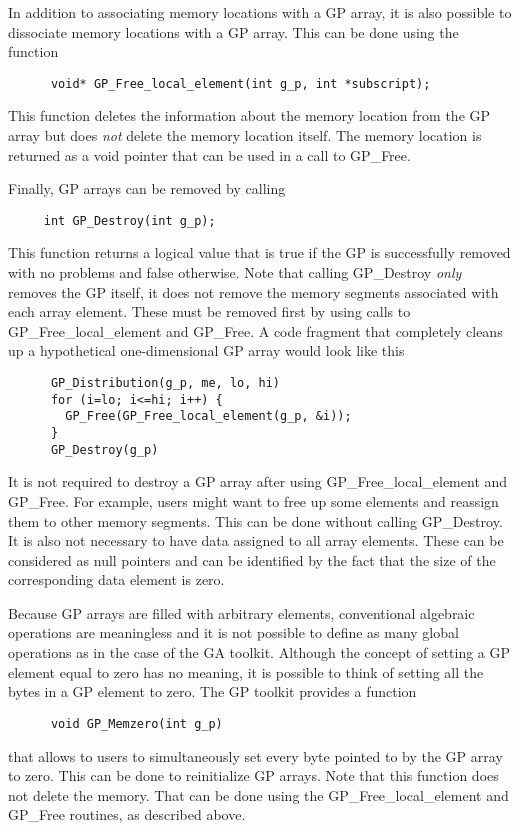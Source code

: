 In addition to associating memory locations with a GP array, it is also possible
to dissociate memory locations with a GP array. This can be done using the
function

\begin{verbatim}
      void* GP_Free_local_element(int g_p, int *subscript);
\end{verbatim}

\noindent
This function deletes the information about the memory location from the GP
array but does \emph{not} delete the memory location itself. The memory location
is returned as a void pointer that can be used in a call to GP\_Free.

Finally, GP arrays can be removed by calling

\begin{verbatim}
     int GP_Destroy(int g_p);
\end{verbatim}

\noindent
This function returns a logical value that is true if the GP is successfully
removed with no problems and false otherwise. Note that calling GP\_Destroy
\emph{only} removes the GP itself, it does not remove the memory segments
associated with each array element. These must be removed first by using calls to
GP\_Free\_local\_element and GP\_Free. A code fragment that completely cleans up
a hypothetical one-dimensional GP array would look like this

\begin{verbatim}
      GP_Distribution(g_p, me, lo, hi)
      for (i=lo; i<=hi; i++) {
        GP_Free(GP_Free_local_element(g_p, &i));
      }
      GP_Destroy(g_p)
\end{verbatim}

\noindent
It is not required to destroy a GP array after using GP\_Free\_local\_element and
GP\_Free. For example, users might want to free up some elements and reassign
them to other memory segments. This can be done without calling GP\_Destroy. It
is also not necessary to have data assigned to all array elements. These can be
considered as null pointers and can be identified by the fact that the size of
the corresponding data element is zero.

Because GP arrays are filled with arbitrary elements, conventional algebraic
operations are meaningless and it is not possible to define as many global
operations as in the case of the GA toolkit. Although the concept of setting a
GP element equal to zero has no meaning, it is possible to think of setting all
the bytes in a GP element to zero. The GP toolkit provides a function

\begin{verbatim}
      void GP_Memzero(int g_p)
\end{verbatim}

\noindent
that allows to users to simultaneously set every byte pointed to by the GP array
to zero. This can be done to reinitialize GP arrays. Note that this
function does not delete the memory. That can be done using the
GP\_Free\_local\_element and GP\_Free routines, as described above.
